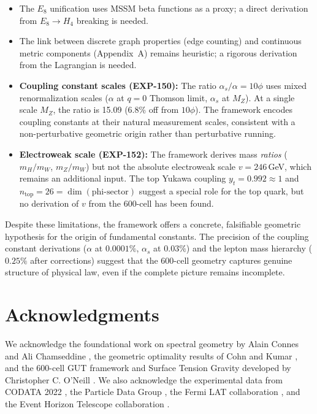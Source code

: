 \documentclass[12pt,a4paper]{article}
\begin{document}
\begin{itemize}
    \item The $E_8$ unification uses MSSM beta functions as a proxy; a direct derivation from $E_8 \to H_4$ breaking is needed.
    \item The link between discrete graph properties (edge counting) and continuous metric components (Appendix~A) remains heuristic; a rigorous derivation from the Lagrangian is needed.
    \item \textbf{Coupling constant scales (EXP-150):} The ratio $\alpha_s/\alpha = 10\phi$ uses mixed renormalization scales ($\alpha$ at $q = 0$ Thomson limit, $\alpha_s$ at $M_Z$). At a single scale $M_Z$, the ratio is 15.09 (6.8\% off from $10\phi$). The framework encodes coupling constants at their natural measurement scales, consistent with a non-perturbative geometric origin rather than perturbative running.
    \item \textbf{Electroweak scale (EXP-152):} The framework derives mass \emph{ratios} ($m_H/m_W$, $m_Z/m_W$) but not the absolute electroweak scale $v = 246\,$GeV, which remains an additional input. The top Yukawa coupling $y_t = 0.992 \approx 1$ and $n_{\text{top}} = 26 = \dim(\text{phi-sector})$ suggest a special role for the top quark, but no derivation of $v$ from the 600-cell has been found.
\end{itemize}

Despite these limitations, the framework offers a concrete, falsifiable geometric hypothesis for the origin of fundamental constants. The precision of the coupling constant derivations ($\alpha$ at $0.0001\%$, $\alpha_s$ at $0.03\%$) and the lepton mass hierarchy ($0.25\%$ after corrections) suggest that the 600-cell geometry captures genuine structure of physical law, even if the complete picture remains incomplete.

\section*{Acknowledgments}

We acknowledge the foundational work on spectral geometry by Alain Connes and Ali Chamseddine \cite{chamseddine1997}, the geometric optimality results of Cohn and Kumar \cite{cohn2007,cohn2011}, and the 600-cell GUT framework and Surface Tension Gravity developed by Christopher C. O'Neill \cite{oneill2025gut,oneill2025stg,oneill2025120cell,oneill2023binary}. We also acknowledge the experimental data from CODATA 2022 \cite{codata2022}, the Particle Data Group \cite{pdg2024}, the Fermi LAT collaboration \cite{fermi2009}, and the Event Horizon Telescope collaboration \cite{eht2019}.
\end{document}
